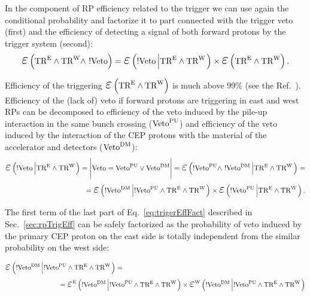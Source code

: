 In the component of RP efficiency related to the trigger we can use again the conditional probability and factorize it to part connected with the trigger veto (first) and the efficiency of detecting a signal of both forward protons by the trigger system (second):
\begin{equation}
\mbox{\LARGE$\varepsilon$}\left(\TRE\land\TRW\land~!\V\right) = \mbox{\LARGE$\varepsilon$}\left(!\V\left|\TRE\land\TRW\right.\right)\times\mbox{\LARGE$\varepsilon$}\left(\TRE\land\TRW\right).
\end{equation}

Efficiency of the triggering $\mbox{\LARGE$\varepsilon$}\left(\TRE\land\TRW\right)$ is much above 99\% (see the Ref.~\cite{supplementaryNote}). Efficiency of the (lack of) veto if forward protons are triggering in east and west RPs can be decomposed to efficiency of the veto induced by the pile-up interaction in the same bunch crossing ($\text{Veto}^{\text{PU}}$) and efficiency of the veto induced by the interaction of the CEP protons with the material of the accelerator and detectors ($\text{Veto}^{\text{DM}}$):
\begin{equation}\label{eq:trigerEffFact}
\begin{split}
\mbox{\LARGE$\varepsilon$}\left(!\V\left|\TRE\land\TRW\right.\right)=\Bigg|\V=\Vpu\vee\Vdm\Bigg|=\mbox{\LARGE$\varepsilon$}\left(!\Vpu\land~!\Vdm\left|\TRE\land\TRW\right.\right) = \\ 
= \mbox{\LARGE$\varepsilon$}\left(!\Vdm\left|!\Vpu\land\TRE\land\TRW\right.\right) \times \mbox{\LARGE$\varepsilon$}\left(!\Vpu\left|\TRE\land\TRW\right.\right).
\end{split}
\end{equation}

The first term of the last part of Eq.~\eqref{eq:trigerEffFact} described in Sec.~\ref{sec:rpTrigEff} can be safely factorized as the probability of veto induced by the primary CEP proton on the east side is totally independent from the similar probability on the west side:

\begin{equation}
\begin{split}
\mbox{\LARGE$\varepsilon$}\left(!\Vdm\left|!\Vpu\land\TRE\land\TRW\right.\right) = ~~~~~~~~~~~~~~~~~~~~~~~~~~~~~~~~~~~~~~~~~~~~~~~~~~~~~~~~~~~~~~~~~~~~~~~~~~~~~~~~~~\\ 
=\mbox{\LARGE$\varepsilon$}^{\text{E}}\left(!\Vdm\left|!\Vpu\land\TRE\land\TRW\right.\right) \times \mbox{\LARGE$\varepsilon$}^{\text{W}}\left(!\Vdm\left|!\Vpu\land\TRE\land\TRW\right.\right)
\end{split}
\end{equation}

